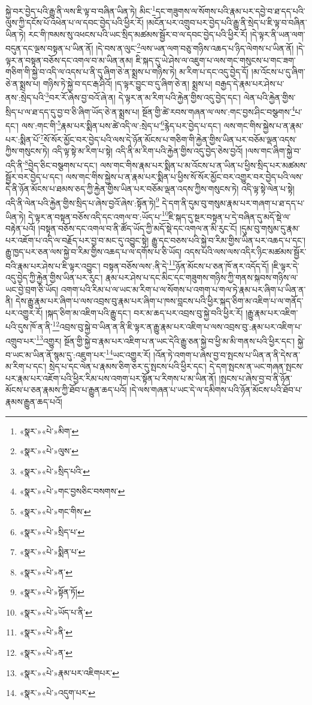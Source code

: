 སྐྱེ་བར་བྱེད་པའི་རྒྱུ་ནི་ལས་ཇི་ལྟ་བ་བཞིན་ཡིན་ཏེ། མིང་\footnote{«སྣར་»«པེ་»མིག་}དང་གཟུགས་ལ་སོགས་པའི་རྣམ་པར་དབྱེ་བ་ཐ་དད་པའི་ལུས་ཀྱི་དངོས་པོ་འཕེན་པ་ལ་དབང་བྱེད་པའི་ཕྱིར་རོ། །མངོན་པར་འགྲུབ་པར་བྱེད་པའི་རྒྱུ་ནི་སྲེད་པ་ཇི་ལྟ་བ་བཞིན་ཡིན་ཏེ། རང་གི་ཁམས་སུ་འཕངས་པའི་ཡང་སྲིད་མཚམས་སྦྱོར་བ་ལ་དབང་བྱེད་པའི་ཕྱིར་རོ། །དེ་ལྟར་ནི་ཡན་ལག་བདུན་དང་ལྔས་བསྟན་པ་ཡིན་ནོ། །དེ་བས་ན་ལུང་\footnote{«སྣར་»«པེ་»ལུས་}ལས་ཡན་ལག་བཅུ་གཉིས་འཆད་པ་ཉིད་ལེགས་པ་ཡིན་ནོ། །དེ་ལྟར་ན་བསྟན་བཅོས་དང་འགལ་བ་མ་ཡིན་ནམ། ཇི་སྐད་དུ་ཡེ་ཤེས་ལ་འཇུག་པ་ལས་གང་གསུངས་པ་གང་ཟག་གཅིག་གི་སྐྱེ་བ་འདི་ལ་འདས་པ་ནི་དུ་ཞིག་ཅེ་ན་སྨྲས་པ་གཉིས་ཏེ། མ་རིག་པ་དང་འདུ་བྱེད་དོ། །མ་འོངས་པ་དུ་ཞིག་ཅེ་ན་སྨྲས་པ། གཉིས་ཏེ་སྐྱེ་བ་དང་རྒ་ཤིའོ། །ད་ལྟར་བྱུང་བ་དུ་ཞིག་ཅེ་ན། སྨྲས་པ། བརྒྱད་དེ་རྣམ་པར་ཤེས་པ་ནས་:སྲེད་པའི་\footnote{«སྣར་»«པེ་»སྲིད་པའི་}བར་རོ་ཞེས་བྱ་བའོ་ཞེ་ན། དེ་ལྟར་ན་མ་རིག་པའི་རྐྱེན་གྱིས་འདུ་བྱེད་དང་། ལེན་པའི་རྐྱེན་གྱིས་སྲིད་པ་ལ་ཐ་དད་དུ་བྱ་བ་ཅི་ཞིག་ཡོད་ཅེ་ན་སྨྲས་པ། སྔོན་གྱི་ཚེ་རབས་གཞན་ལ་ལས་:གང་བྱས་ཤིང་བསྩགས་\footnote{«སྣར་»«པེ་»གང་བྱསཅིང་བསགས་}པ་དང་། ལས་:གང་གི་\footnote{«སྣར་»«པེ་»གང་གིས་}རྣམ་པར་སྨིན་པས་ཚེ་འདི་ལ་:སྲེད་པ་\footnote{«སྣར་»«པེ་»སྲིད་པ་}རྙེད་པར་བྱེད་པ་དང་། ལས་གང་གིས་སྐྱེས་པ་ན་རྣམ་པར་:སྨིན་པོ་\footnote{«སྣར་»«པེ་»སྨིན་པ་}སོ་སོར་མྱོང་བར་བྱེད་པའི་ལས་དེ་ཉོན་མོངས་པ་གཅིག་གི་རྐྱེན་གྱིས་ཡིན་པར་བཅོམ་ལྡན་འདས་ཀྱིས་གསུངས་ཏེ། འདི་ལྟ་སྟེ་མ་རིག་པ་སྟེ། འདི་ནི་མ་རིག་པའི་རྐྱེན་གྱིས་འདུ་བྱེད་ཅེས་བྱའོ། །ལས་གང་ཞིག་སྐྱེ་བ་འདི་ནི་\footnote{«སྣར་»«པེ་»ན་}བྱེད་ཅིང་བསྩགས་པ་དང་། ལས་གང་གིས་རྣམ་པར་སྨིན་པ་མ་འོངས་པ་ན་ཡིན་པ་ཕྱིས་སྲིད་པར་མཚམས་སྦྱོར་བར་བྱེད་པ་དང་། ལས་གང་གིས་སྐྱེས་པ་ན་རྣམ་པར་སྨིན་པ་ཕྱིས་སོ་སོར་མྱོང་བར་འགྱུར་བར་བྱེད་པའི་ལས་དེ་ནི་ཉོན་མོངས་པ་ཐམས་ཅད་ཀྱི་རྐྱེན་གྱིས་ཡིན་པར་བཅོམ་ལྡན་འདས་ཀྱིས་གསུངས་ཏེ། འདི་ལྟ་སྟེ་ལེན་པ་སྟེ། འདི་ནི་ལེན་པའི་རྐྱེན་གྱིས་སྲིད་པ་ཞེས་བྱའོ་ཞེས་:སྟོན་ཏེ།\footnote{«སྣར་»«པེ་»སྟོན་ཏོ།} དེ་དག་ནི་དུམ་བུ་གསུམ་རྣམ་པར་གཞག་པ་ཐ་དད་པ་ཡིན་ཏེ། དེ་ལྟར་ན་བསྟན་བཅོས་འདི་དང་འགལ་བ་:ཡོད་པ་\footnote{«སྣར་»«པེ་»ཡོད་པ་ནི་}ཇི་སྐད་དུ་སྔར་བསྟན་པ་དེ་བཞིན་དུ་མདོ་སྡེ་ལ་བརྟེན་པའོ། །བསྟན་བཅོས་དང་འགལ་བ་ནི་ཚོད་ཡོད་ཀྱི་མདོ་སྡེ་དང་འགལ་ན་མི་རུང་ངོ། །དུམ་བུ་གསུམ་དུ་རྣམ་པར་འཇོག་པ་འདི་ལ་བརྗོད་པར་བྱ་བ་མང་དུ་འབྱུང་སྟེ། རྒྱུ་དང་བཅས་པའི་སྐྱེ་བ་རིམ་གྱིས་ཡིན་པར་འཆད་པ་དང་། རྒྱུ་ཁྱད་པར་ཅན་ལས་སྐྱེ་བ་རིམ་གྱིས་འཆད་པ་ལ་དགོས་པ་ཅི་ཡོད། འདས་པའི་ལས་ལས་འདིར་ཉིང་མཚམས་སྦྱོར་བའི་རྣམ་པར་ཤེས་པ་ཇི་ལྟར་འབྱུང་། བསྟན་བཅོས་ལས་:ནི་དེ་\footnote{«སྣར་»«པེ་»ནི་}ཉོན་མོངས་པ་ཅན་ཁོ་ནར་འདོད་དོ། །ཇི་ལྟར་དེ་འདུ་བྱེད་ཀྱི་རྐྱེན་གྱིས་ཡིན་པར་རུང་། རྣམ་པར་ཤེས་པ་དང་མིང་དང་གཟུགས་གཉིས་ཀྱི་གནས་སྐབས་གཉིས་ལ་ཡང་བྱེ་བྲག་ཅི་ཡོད། འགག་པའི་རིམ་པ་ལ་ཡང་མ་རིག་པ་ལ་སོགས་པ་འགག་པ་གལ་ཏེ་རྣམ་པར་ཞིག་པ་ཡིན་ན་ནི། དེས་རྒྱུ་རྣམ་པར་ཞིག་པ་ལས་འབྲས་བུ་རྣམ་པར་ཞིག་པ་ཁས་བླངས་པའི་ཕྱིར་སྐད་ཅིག་མ་འཇིག་པ་ལ་གནོད་པར་འགྱུར་རོ། །སྐད་ཅིག་མ་འཇིག་པའི་རྒྱུ་དང་། བར་མ་ཆད་པར་འབྲས་བུ་སྐྱེ་བའི་ཕྱིར་རོ། །རྒྱུ་རྣམ་པར་འཇིག་པའི་དུས་ཁོ་ན་ནི་\footnote{«སྣར་»«པེ་»ན་}འབྲས་བུ་སྐྱེ་བ་ཡིན་ན་ནི་ཇི་ལྟར་ན་རྒྱུ་རྣམ་པར་འཇིག་པ་ལས་འབྲས་བུ་:རྣམ་པར་འཇིག་པ་འགྲུབ་པར་\footnote{«སྣར་»«པེ་»རྣམ་པར་འཇིགཔར་}འགྱུར། སྔོན་གྱི་སྐྱེ་བ་རྣམ་པར་འཇིག་པ་ན་ཡང་དེའི་རྒྱུ་ཅན་སྐྱེ་བ་ཕྱི་མ་མི་གནས་པའི་ཕྱིར་དང་། སྐྱེ་བ་ཡང་མ་ཡིན་ནོ་སྙམ་དུ་:འཇུག་པར་\footnote{«སྣར་»«པེ་»འདུག་པར་}ཡང་འགྱུར་རོ། །འོན་ཏེ་འགག་པ་ཞེས་བྱ་བ་སྤངས་པ་ཡིན་ན་ནི་དེས་ན་མ་རིག་པ་དང་། སྲེད་པ་དང་ལེན་པ་རྣམས་ཅིག་ཅར་དུ་སྤངས་པའི་ཕྱིར་དང་། དེ་དག་སྤངས་ན་ཡང་གཞན་སྤངས་པར་རྣམ་པར་འཇོག་པའི་ཕྱིར་རིམ་པས་འགག་པར་སྟོན་པ་རིགས་པ་མ་ཡིན་ནོ། །སྤངས་པ་ཞེས་བྱ་བ་ནི་ཉོན་མོངས་པ་ཅན་རྣམས་ཀྱི་ཐོབ་པ་རྒྱུན་ཆད་པའོ། །དེ་ལས་གཞན་པ་ཡང་དེ་ལ་དམིགས་པའི་ཉོན་མོངས་པའི་ཐོབ་པ་རྣམས་རྒྱུན་ཆད་པའོ། 